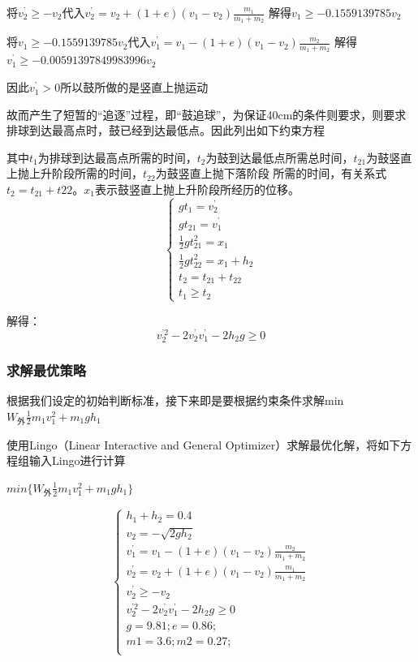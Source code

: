 \documentclass[UTF8]{article}
\begin{document}
将$v_2^{\mbox{'}}\ge-v_2$代入$v_2^{\mbox{'}}=v_2+(1+e)(v_1-v_2)\frac{m_1}{m_1+m_2}$
解得$v_1\ge-0.1559139785v_2$

将$v_1\ge-0.1559139785v_2$代入$v_1^{\mbox{'}}=v_1-(1+e)(v_1-v_2)\frac{m_2}{m_1+m_2}$
解得$v_1^{\mbox{'}}\ge-0.00591397849983996v_2$

因此$v_1^{\mbox{'}}>0$所以鼓所做的是竖直上抛运动

故而产生了短暂的“追逐”过程，即“鼓追球”，为保证40cm的条件则要求，则要求排球到达最高点时，鼓已经到达最低点。因此列出如下约束方程

其中$t_1$为排球到达最高点所需的时间，$t_2$为鼓到达最低点所需总时间，$t_{21}$为鼓竖直上抛上升阶段所需的时间，$t_{22}$为鼓竖直上抛下落阶段
所需的时间，有关系式$t_2=t_{21}+t{22}$。$x_1$表示鼓竖直上抛上升阶段所经历的位移。
\begin{equation}
    \begin{cases}
        gt_1=v_2^{\mbox{'}}\\
        gt_{21}=v_1^{\mbox{'}}\\
        \frac{1}{2}gt^2_{21}=x_1\\
        \frac{1}{2}gt^2_{22}=x_1+h_2\\
        t_2=t_{21}+t_{22}\\
        t_1\ge t_2
    \end{cases}
\end{equation}

解得：
\begin{equation}
    v_2^{\mbox{'2}}-2v_2^{\mbox{'}}v_1^{\mbox{'}}-2h_2g \ge 0
\end{equation}

\subsubsection{求解最优策略}
根据我们设定的初始判断标准，接下来即是要根据约束条件求解min{$W_{\mbox{外}}\frac{1}{2}m_1v_1^2+m_1gh_1$}

使用Lingo（Linear Interactive and General Optimizer）求解最优化解，将如下方程组输入Lingo进行计算
\begin{center}
    $min \{ {W_{\mbox{外}}\frac{1}{2}m_1v_1^2+m_1gh_1} \}$    
\end{center}
\begin{equation}
    \begin{cases}
        h_1+h_2=0.4\\
        v_2=-\sqrt{2gh_2}\\
        v_1^{\mbox{'}}=v_1-(1+e)(v_1-v_2)\frac{m_2}{m_1+m_2}\\
        v_2^{\mbox{'}}=v_2+(1+e)(v_1-v_2)\frac{m_1}{m_1+m_2}\\
        v_2^{\mbox{'}}\ge-v_2\\
        v_2^{\mbox{'2}}-2v_2^{\mbox{'}}v_1^{\mbox{'}}-2h_2g \ge 0\\
        g=9.81; e=0.86; \\
        m1=3.6; m2=0.27;\\
    \end{cases}
\end{equation}
\end{document}
